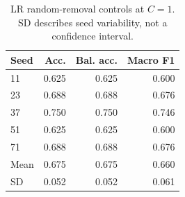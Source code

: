 \begin{table}[t]
\caption{LR random-removal controls at $C=1$. SD describes seed variability, not a confidence interval.}
\label{tab:control}
\centering\footnotesize
\begin{tabular}{lrrr}
\toprule Seed & Acc. & Bal. acc. & Macro F1 \\
\midrule
11 & 0.625 & 0.625 & 0.600 \\
23 & 0.688 & 0.688 & 0.676 \\
37 & 0.750 & 0.750 & 0.746 \\
51 & 0.625 & 0.625 & 0.600 \\
71 & 0.688 & 0.688 & 0.676 \\
\midrule
Mean & 0.675 & 0.675 & 0.660 \\
SD & 0.052 & 0.052 & 0.061 \\
\bottomrule\end{tabular}
\end{table}